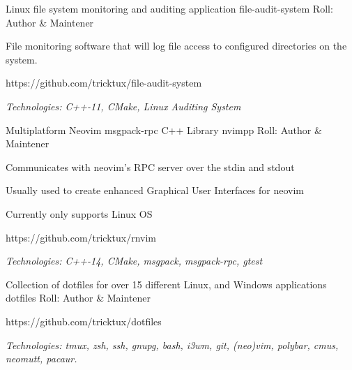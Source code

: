 

\begin{cventries}
  \cventry
  {Linux file system monitoring and auditing application} %
  {file-audit-system} %
  {} %
  {Roll: Author \& Maintener} %
  {
    \begin{cvitems} %
    \item {File monitoring software that will log file access to configured directories on the system.}
    \item {https://github.com/tricktux/file-audit-system}
    \item {\it{Technologies:} C++-11, CMake, Linux Auditing System}
    \end{cvitems}
  }

	\cventry
		{Multiplatform Neovim msgpack-rpc C++ Library} %
		{nvimpp} %
		{} %
		{Roll: Author \& Maintener} %
		{
			\begin{cvitems} %
				\item {Communicates with neovim's RPC server over the stdin and stdout}
				\item {Usually used to create enhanced Graphical User Interfaces for neovim}
				\item {Currently only supports Linux OS}
				\item {https://github.com/tricktux/rnvim}
				\item {\it{Technologies:} C++-14, CMake, msgpack, msgpack-rpc, gtest}
			\end{cvitems}
		}

  \cventry
		{Collection of dotfiles for over 15 different Linux, and Windows applications} %
    {dotfiles} %
    {} %
		{Roll: Author \& Maintener} %
    {
      \begin{cvitems} %
				\item {https://github.com/tricktux/dotfiles}
				\item {\it{Technologies:} tmux, zsh, ssh, gnupg, bash, i3wm, git, (neo)vim, polybar, cmus, neomutt, pacaur.}
      \end{cvitems}
    }


\end{cventries}
